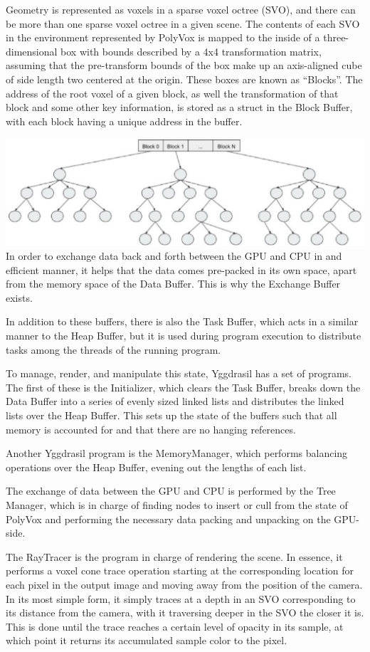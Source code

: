 \documentclass[onecolumn, draftclsnofoot,10pt, compsoc]{IEEEtran}
\begin{document}
Geometry is represented as voxels in a sparse voxel octree (SVO), and there can be more than one sparse voxel octree in a given scene. The contents of each SVO in the environment represented by PolyVox is mapped to the inside of a three-dimensional box with bounds described by a 4x4 transformation matrix, assuming that the pre-transform bounds of the box make up an axis-aligned cube of side length two centered at the origin. These boxes are known as “Blocks”. The address of the root voxel of a given block, as well the transformation of that block and some other key information, is stored as a struct in the Block Buffer, with each block having a unique address in the buffer.

\includegraphics{image9}
In order to exchange data back and forth between the GPU and CPU in and efficient manner, it helps that the data comes pre-packed in its own space, apart from the memory space of the Data Buffer. This is why the Exchange Buffer exists.

In addition to these buffers, there is also the Task Buffer, which acts in a similar manner to the Heap Buffer, but it is used during program execution to distribute tasks among the threads of the running program.

To manage, render, and manipulate this state, Yggdrasil has a set of programs. The first of these is the Initializer, which clears the Task Buffer, breaks down the Data Buffer into a series of evenly sized linked lists and distributes the linked lists over the Heap Buffer. This sets up the state of the buffers such that all memory is accounted for and that there are no hanging references.

Another Yggdrasil program is the MemoryManager, which performs balancing operations over the Heap Buffer, evening out the lengths of each list.

The exchange of data between the GPU and CPU is performed by the Tree Manager, which is in charge of finding nodes to insert or cull from the state of PolyVox and performing the necessary data packing and unpacking on the GPU-side.

The RayTracer is the program in charge of rendering the scene. In essence, it performs a voxel cone trace operation starting at the corresponding location for each pixel in the output image and moving away from the position of the camera. In its most simple form, it simply traces at a depth in an SVO corresponding to its distance from the camera, with it traversing deeper in the SVO the closer it is. This is done until the trace reaches a certain level of opacity in its sample, at which point it returns its accumulated sample color to the pixel.
\end{document}
